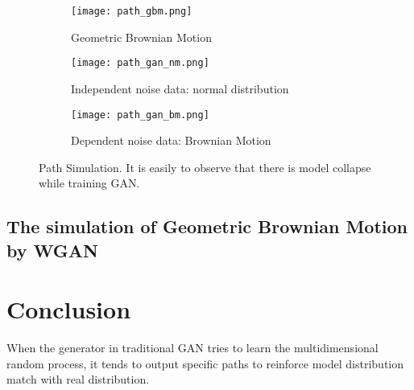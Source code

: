 \documentclass{article}
\begin{document}
	\begin{figure}
		\begin{subfigure}[b]{0.5\textwidth}
			\texttt{[image: path\_gbm.png]}
			\caption{Geometric Brownian Motion}
		\end{subfigure}
		\begin{subfigure}[b]{0.5\textwidth}
			\texttt{[image: path\_gan\_nm.png]}
			\caption{Independent noise data: normal distribution}
		\end{subfigure}
		\begin{subfigure}[b]{0.5\textwidth}
			\texttt{[image: path\_gan\_bm.png]}
			\caption{Dependent noise data: Brownian Motion}
		\end{subfigure}
	\caption{Path Simulation. It is easily to observe that there is model collapse while training GAN.}
	\label{fig:path_gan}
	\end{figure}


	\subsection{The simulation of Geometric Brownian Motion by WGAN}
	
	\section{Conclusion}
	
	When the generator in traditional GAN tries to learn the multidimensional random process, it tends to output specific paths to reinforce model distribution match with real distribution. 


	
	

	
	
	
	
	
	
\end{document}
